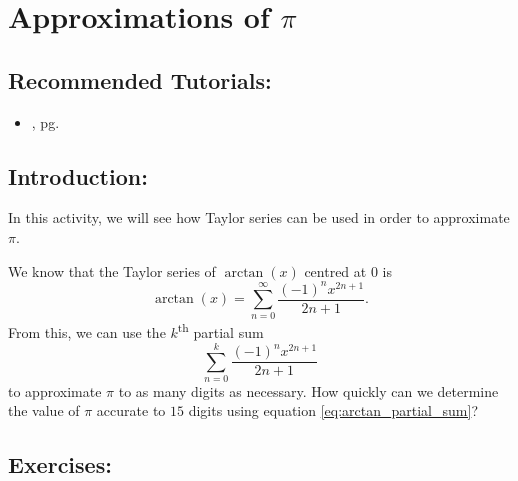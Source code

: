 \section{Approximations of $\pi$}
\label{sec:approximations_of_pi}		

\subsection*{Recommended Tutorials:}
\begin{itemize}[noitemsep]
	\item {}, pg. \pageref{chp:sequence_and_sseries}
\end{itemize}
\subsection*{Introduction:}

In this activity, we will see how Taylor series can be used in order to approximate $\pi$.

We know that the Taylor series of $\arctan(x)$ centred at $0$ is
\[\arctan(x) = \sum_{n=0}^{\infty} \dfrac{(-1)^n x^{2n+1}}{2n+1}.\]
From this, we can use the $k$\textsuperscript{th} partial sum 
\begin{equation}
    \label{eq:arctan_partial_sum}
    \sum_{n=0}^{k} \dfrac{(-1)^n x^{2n+1}}{2n+1}
\end{equation}
to approximate $\pi$ to as many digits as necessary. How quickly can we determine the value of $\pi$ accurate to $15$ digits using equation \eqref{eq:arctan_partial_sum}?

\subsection*{Exercises:}

